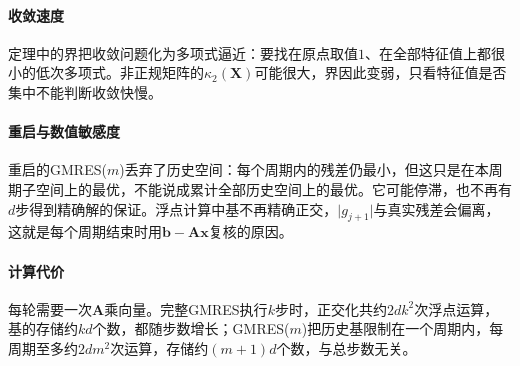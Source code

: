 \paragraph{收敛速度}
定理中的界把收敛问题化为多项式逼近：要找在原点取值$1$、在全部特征值上都很小的低次多项式。非正规矩阵的$\kappa_2(\bm X)$可能很大，界因此变弱，只看特征值是否集中不能判断收敛快慢。

\paragraph{重启与数值敏感度}
重启的GMRES($m$)丢弃了历史空间：每个周期内的残差仍最小，但这只是在本周期子空间上的最优，不能说成累计全部历史空间上的最优。它可能停滞，也不再有$d$步得到精确解的保证。浮点计算中基不再精确正交，$\lvert g_{j+1}\rvert$与真实残差会偏离，这就是每个周期结束时用$\bm b-\bm A\bm x$复核的原因。

\paragraph{计算代价}
每轮需要一次$\bm A$乘向量。完整GMRES执行$k$步时，正交化共约$2dk^2$次浮点运算，基的存储约$kd$个数，都随步数增长；GMRES($m$)把历史基限制在一个周期内，每周期至多约$2dm^2$次运算，存储约$(m+1)d$个数，与总步数无关。
